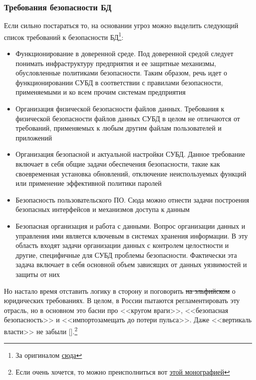 \subsubsection{Требования безопасности БД}
Если сильно постараться то, на основании угроз можно выделить следующий список требований к безопасности БД\footnote{За оригиналом \href{https://tproger.ru/articles/db-security-basics/}{сюда}}:
\begin{itemize}
	\item Функционирование в доверенной среде. Под доверенной средой следует понимать инфраструктуру предприятия и ее защитные механизмы, обусловленные политиками безопасности. Таким образом, речь идет о функционировании СУБД в соответствии с правилами безопасности, применяемыми и ко всем прочим системам предприятия
	
	\item Организация физической безопасности файлов данных. Требования к физической безопасности файлов данных СУБД в целом не отличаются от требований, применяемых к любым другим файлам пользователей и приложений
	
	\item Организация безопасной и актуальной настройки СУБД. Данное требование включает в себя общие задачи обеспечения безопасности, такие как своевременная установка обновлений, отключение неиспользуемых функций или применение эффективной политики паролей
	
	\item Безопасность пользовательского ПО. Сюда можно отнести задачи построения безопасных интерфейсов и механизмов доступа к данным
	
	\item Безопасная организация и работа с данными. Вопрос организации данных и управления ими является ключевым в системах хранения информации. В эту область входят задачи организации данных с контролем целостности и другие, специфичные для СУБД проблемы безопасности. Фактически эта задача включает в себя основной объем зависящих от данных уязвимостей и защиты от них
\end{itemize}

Но настало время отставить логику в сторону и поговорить \sout{на эльфийском} о юридических требованиях. В целом, в России пытаются регламентировать эту отрасль, но в основном это басни про <<кругом враги>>, <<безопасная безопасность>> и <<импортозамещать до потери пульса>>. Даже <<вертикаль власти>> не забыли [\autocite{Mysev2019}].\footnote{Если очень хочется, то можно преисполниться вот \href{https://publications.hse.ru/mirror/pubs/share/folder/ie7oj6cz00/direct/202314863}{этой монографией}}

